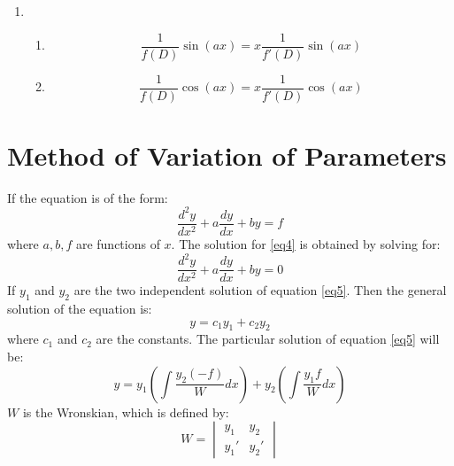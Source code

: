 \begin{enumerate}
	\item \begin{enumerate}
		\item \begin{equation} \dfrac{1}{f(D)} \sin (ax) = x\dfrac{1}{f'(D)} \sin (ax)\end{equation}

		\item \begin{equation} \dfrac{1}{f(D)} \cos (ax) = x\dfrac{1}{f'(D)} \cos (ax)\end{equation}
	\end{enumerate}
\end{enumerate}

\section{Method of Variation of Parameters}
If the equation is of the form:
\begin{equation}
	\dfrac{d^2y}{dx^2}+a\dfrac{dy}{dx}+by=f\label{eq4}
\end{equation}
where $a,b,f$ are functions of $x$. The solution for \ref{eq4} is obtained by solving for:
\begin{equation}\label{eq5}
	\dfrac{d^2y}{dx^2}+a\dfrac{dy}{dx}+by=0
\end{equation}
If $y_1$ and $y_2$ are the two independent solution of equation \ref{eq5}.\newline
Then the general solution of the equation is:
\begin{equation}
	y=c_1y_1+c_2y_2
\end{equation}
where $c_1$ and $c_2$ are the constants.\newline
The particular solution of equation \ref{eq5} will be:
\begin{equation}
	y=y_1 \left(\int \dfrac{y_2(-f)}{W}dx\right)+y_2\left(\int \dfrac{y_1 f}{W}dx\right)
\end{equation}
$W$ is the Wronskian, which is defined by:
\begin{equation}
	W=\begin{vmatrix}
		y_1&y_2\\
		y_1'&y_2'
	\end{vmatrix}
\end{equation}

